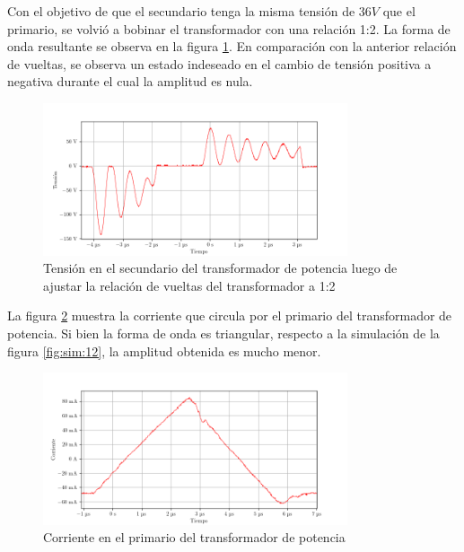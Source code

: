 Con el objetivo de que el secundario tenga la misma tensión de $36V$ que el primario, se volvió a bobinar el transformador con una relación 1:2. La forma de onda resultante se observa en la figura \ref{fig:osc:41}. En comparación con la anterior relación de vueltas, se observa un estado indeseado en el cambio de tensión positiva a negativa durante el cual la amplitud es nula.

\begin{figure}[H]
    \centering
    \includegraphics[width=0.8\textwidth]{images/capturas-osciloscopio/17-11-2022/56.png}
    \caption{Tensión en el secundario del transformador de potencia luego de ajustar la relación de vueltas del transformador a 1:2}
    \label{fig:osc:41}
\end{figure}


La figura \ref{fig:osc:24} muestra la corriente que circula por el primario del transformador de potencia. 
Si bien la forma de onda es triangular, respecto a la simulación de la figura \ref{fig:sim:12}, la amplitud obtenida es mucho menor. 

\begin{figure}[H]
    \centering
    \includegraphics[width=0.8\textwidth]{images/capturas-osciloscopio/17-11-2022/24.png}
    \caption{Corriente en el primario del transformador de potencia}
    \label{fig:osc:24}
\end{figure}

